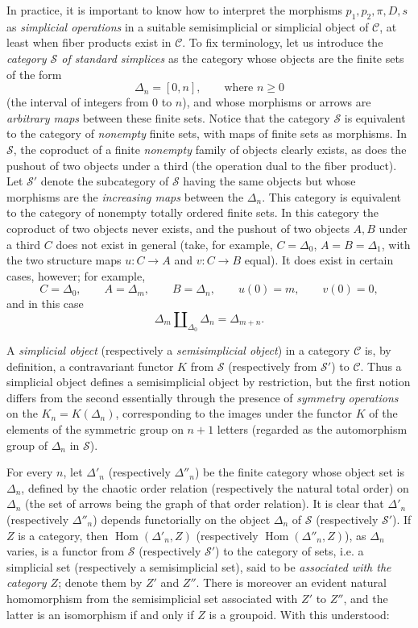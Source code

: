 In practice, it is important to know how to interpret the morphisms
$p_1,p_2,\pi,D,s$ as \emph{simplicial operations} in a suitable semisimplicial
or simplicial object of $\mathcal C$, at least when fiber products exist in
$\mathcal C$. To fix terminology, let us introduce the \emph{category
$\mathcal S$ of standard simplices} as the category whose objects are the
finite sets of the form
\[
  \Delta_n=[0,n],\qquad\text{where }n\geq 0
\]
(the interval of integers from $0$ to $n$), and whose morphisms or arrows are
\emph{arbitrary maps} between these finite sets. Notice that the category
$\mathcal S$ is equivalent to the category of \emph{nonempty} finite sets,
with maps of finite sets as morphisms. In $\mathcal S$, the coproduct of a
finite \emph{nonempty} family of objects clearly exists, as does the pushout
of two objects under a third (the operation dual to the fiber product). Let
$\mathcal S'$ denote the subcategory of $\mathcal S$ having the same objects
but whose morphisms are the \emph{increasing maps} between the $\Delta_n$.
This category is equivalent to the category of nonempty totally ordered
finite sets. In this category the
coproduct of two objects never exists, and the pushout of two objects $A,B$
under a third $C$ does not exist in general (take, for example,
$C=\Delta_0$, $A=B=\Delta_1$, with the two structure maps $u:C\to A$ and
$v:C\to B$ equal). It does exist in certain cases, however; for example,
\[
  C=\Delta_0,\qquad A=\Delta_m,\qquad B=\Delta_n,\qquad
  u(0)=m,\qquad v(0)=0,
\]
and in this case
\[
  \Delta_m\amalg_{\Delta_0}\Delta_n=\Delta_{m+n}.
\]

A \emph{simplicial object} (respectively a \emph{semisimplicial object}) in a
category $\mathcal C$ is, by definition, a contravariant functor $K$ from
$\mathcal S$ (respectively from $\mathcal S'$) to $\mathcal C$. Thus a
simplicial object defines a semisimplicial object by restriction, but the
first notion differs from the second essentially through the presence of
\emph{symmetry operations} on the $K_n=K(\Delta_n)$, corresponding to the
images under the functor $K$ of the elements of the symmetric group on $n+1$
letters (regarded as the automorphism group of $\Delta_n$ in $\mathcal S$).

For every $n$, let $\Delta'_n$ (respectively $\Delta''_n$) be the finite
category whose object set is $\Delta_n$, defined by the chaotic order relation
(respectively the natural total order) on $\Delta_n$ (the set of arrows being
the graph of that order relation). It is clear that $\Delta'_n$ (respectively
$\Delta''_n$) depends functorially on the object $\Delta_n$ of $\mathcal S$
(respectively $\mathcal S'$). If $Z$ is a category, then
$\operatorname{Hom}(\Delta'_n,Z)$ (respectively
$\operatorname{Hom}(\Delta''_n,Z)$), as $\Delta_n$ varies, is a functor from
$\mathcal S$ (respectively $\mathcal S'$) to the category of sets, i.e. a
simplicial set (respectively a semisimplicial set), said to be
\emph{associated with the category $Z$}; denote them by $Z'$ and $Z''$. There
is moreover an evident natural homomorphism from the semisimplicial set
associated with $Z'$ to $Z''$, and the latter is an isomorphism if and only if
$Z$ is a groupoid. With this understood:

